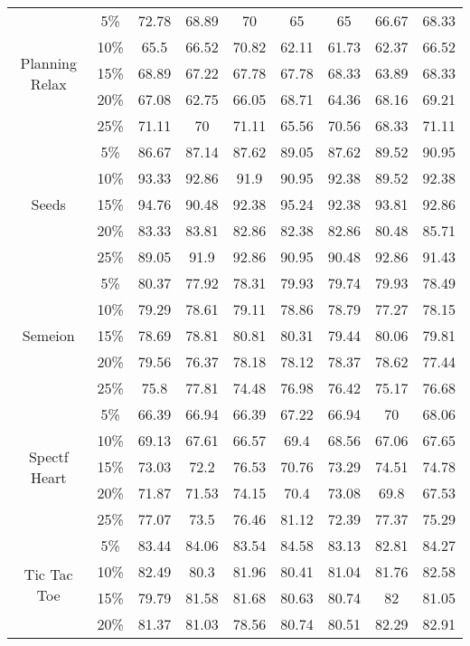\begin{longtable}[c]{|c|c|c|c|c|c|c|c|c|}
\multirow{5}{*}{Planning Relax}
& 5\% & 72.78 & 68.89 & 70 & 65 & 65 & 66.67 & 68.33 \\ 
& 10\% & 65.5 & 66.52 & 70.82 & 62.11 & 61.73 & 62.37 & 66.52 \\
& 15\% & 68.89 & 67.22 & 67.78 & 67.78 & 68.33 & 63.89 & 68.33 \\
& 20\% & 67.08 & 62.75 & 66.05 & 68.71 & 64.36 & 68.16 & 69.21 \\
& 25\% & 71.11 & 70 & 71.11 & 65.56 & 70.56 & 68.33 & 71.11 \\ \hline
\multirow{5}{*}{Seeds}
& 5\% & 86.67 & 87.14 & 87.62 & 89.05 & 87.62 & 89.52 & 90.95 \\ 
& 10\% & 93.33 & 92.86 & 91.9 & 90.95 & 92.38 & 89.52 & 92.38 \\
& 15\% & 94.76 & 90.48 & 92.38 & 95.24 & 92.38 & 93.81 & 92.86 \\
& 20\% & 83.33 & 83.81 & 82.86 & 82.38 & 82.86 & 80.48 & 85.71 \\
& 25\% & 89.05 & 91.9 & 92.86 & 90.95 & 90.48 & 92.86 & 91.43 \\ \hline
\multirow{5}{*}{Semeion}
& 5\% & 80.37 & 77.92 & 78.31 & 79.93 & 79.74 & 79.93 & 78.49 \\ 
& 10\% & 79.29 & 78.61 & 79.11 & 78.86 & 78.79 & 77.27 & 78.15 \\
& 15\% & 78.69 & 78.81 & 80.81 & 80.31 & 79.44 & 80.06 & 79.81 \\
& 20\% & 79.56 & 76.37 & 78.18 & 78.12 & 78.37 & 78.62 & 77.44 \\
& 25\% & 75.8 & 77.81 & 74.48 & 76.98 & 76.42 & 75.17 & 76.68 \\ \hline
\multirow{5}{*}{Spectf Heart}
& 5\% & 66.39 & 66.94 & 66.39 & 67.22 & 66.94 & 70 & 68.06 \\ 
& 10\% & 69.13 & 67.61 & 66.57 & 69.4 & 68.56 & 67.06 & 67.65 \\
& 15\% & 73.03 & 72.2 & 76.53 & 70.76 & 73.29 & 74.51 & 74.78 \\
& 20\% & 71.87 & 71.53 & 74.15 & 70.4 & 73.08 & 69.8 & 67.53 \\
& 25\% & 77.07 & 73.5 & 76.46 & 81.12 & 72.39 & 77.37 & 75.29 \\ \hline
\multirow{5}{*}{Tic Tac Toe}
& 5\% & 83.44 & 84.06 & 83.54 & 84.58 & 83.13 & 82.81 & 84.27 \\ 
& 10\% & 82.49 & 80.3 & 81.96 & 80.41 & 81.04 & 81.76 & 82.58 \\
& 15\% & 79.79 & 81.58 & 81.68 & 80.63 & 80.74 & 82 & 81.05 \\
& 20\% & 81.37 & 81.03 & 78.56 & 80.74 & 80.51 & 82.29 & 82.91 \\

\end{longtable}
